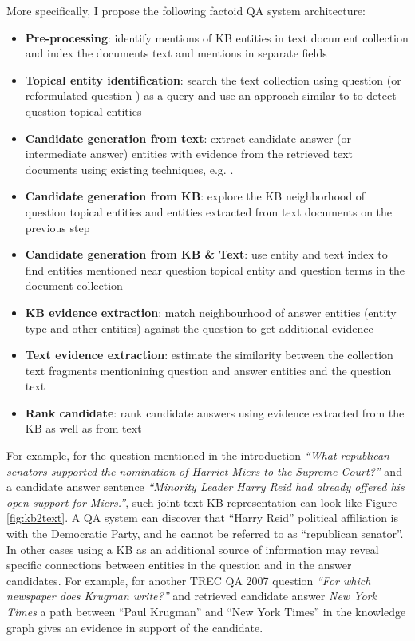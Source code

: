 More specifically, I propose the following factoid QA system architecture:
\begin{itemize}
\setlength\itemsep{0em}
\item \textbf{Pre-processing}: identify mentions of KB entities in text document collection and index the documents text and mentions in separate fields
\item \textbf{Topical entity identification}: search the text collection using question (or reformulated question \cite{AgichteinLG01}) as a query and use an approach similar to \cite{cornolti2014smaph} to detect question topical entities
\item \textbf{Candidate generation from text}: extract candidate answer (or intermediate answer) entities with evidence from the retrieved text documents using existing techniques, e.g. \cite{tsai2015web}.
\item \textbf{Candidate generation from KB}: explore the KB neighborhood of question topical entities and entities extracted from text documents on the previous step
\item \textbf{Candidate generation from KB \& Text}: use entity and text index to find entities mentioned near question topical entity and question terms in the document collection
\item \textbf{KB evidence extraction}: match neighbourhood of answer entities (entity type and other entities) against the question to get additional evidence
\item \textbf{Text evidence extraction}: estimate the similarity between the collection text fragments mentionining question and answer entities and the question text
\item \textbf{Rank candidate}: rank candidate answers using evidence extracted from the KB as well as from text
\end{itemize}

For example, for the question mentioned in the introduction \textit{``What republican senators supported the nomination of Harriet Miers to the Supreme Court?''} and a candidate answer sentence \textit{``Minority Leader Harry Reid had already offered his open support for Miers.''}, such joint text-KB representation can look like Figure \ref{fig:kb2text}.
A QA system can discover that ``Harry Reid'' political affiliation is with the Democratic Party, and he cannot be referred to as ``republican senator''.
In other cases using a KB as an additional source of information may reveal specific connections between entities in the question and in the answer candidates.
For example, for another TREC QA 2007 question \textit{``For which newspaper does Krugman write?''} and retrieved candidate answer \textit{New York Times} a path between ``Paul Krugman'' and ``New York Times'' in the knowledge graph gives an evidence in support of the candidate.

